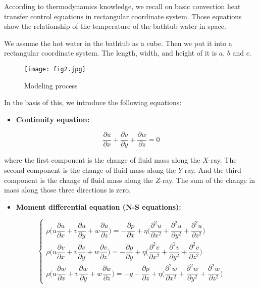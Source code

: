 \documentclass{mcmthesis}
\begin{document}
According to thermodynamics knowledge, we recall on basic convection
heat transfer control equations in rectangular coordinate system. Those
equations show the relationship of the temperature of the bathtub water in space.

We assume the hot water in the bathtub as a cube. Then we put it into a
rectangular coordinate system. The length, width, and height of it is $a,\, b$
and $c$.

\begin{figure}[h]
    \centering
    \texttt{[image: fig2.jpg]}
    \caption{Modeling process} \label{fig2}
\end{figure}

In the basis of this, we introduce the following equations:

\begin{itemize}
    \item {\bf Continuity equation:}
\end{itemize}

\begin{equation} \label{eq1}
    \frac{\partial u}{\partial x} + \frac{\partial v}{\partial y} +
    \frac{\partial w}{\partial z} = 0
\end{equation}

\noindent where the first component is the change of fluid mass along the $X$-ray.
The second component is the change of fluid mass along the $Y$-ray. And the third
component is the change of fluid mass along the $Z$-ray. The sum of the change in
mass along those three directions is zero.

\begin{itemize}
    \item {\bf Moment differential equation (N-S equations):}
\end{itemize}

\begin{equation} \label{eq2}
    \left\{
    \begin{array}{l} \!\!
        \rho \Big(u \dfrac{\partial u}{\partial x} + v \dfrac{\partial u}{\partial y} +
        w\dfrac{\partial u}{\partial z} \Big) = -\dfrac{\partial p}{\partial x} +
        \eta \Big(\dfrac{\partial^2 u}{\partial x^2} + \dfrac{\partial^2 u}{\partial y^2} +
        \dfrac{\partial^2 u}{\partial z^2} \Big) \\[0.3cm]
        \rho \Big(u \dfrac{\partial v}{\partial x} + v \dfrac{\partial v}{\partial y} +
        w\dfrac{\partial v}{\partial z} \Big) = -\dfrac{\partial p}{\partial y} +
        \eta \Big(\dfrac{\partial^2 v}{\partial x^2} + \dfrac{\partial^2 v}{\partial y^2} +
        \dfrac{\partial^2 v}{\partial z^2} \Big) \\[0.3cm]
        \rho \Big(u \dfrac{\partial w}{\partial x} + v \dfrac{\partial w}{\partial y} +
        w\dfrac{\partial w}{\partial z} \Big) = -g-\dfrac{\partial p}{\partial z} +
        \eta \Big(\dfrac{\partial^2 w}{\partial x^2} + \dfrac{\partial^2 w}{\partial y^2} +
        \dfrac{\partial^2 w}{\partial z^2} \Big)
    \end{array}
    \right.
\end{equation}
\end{document}
